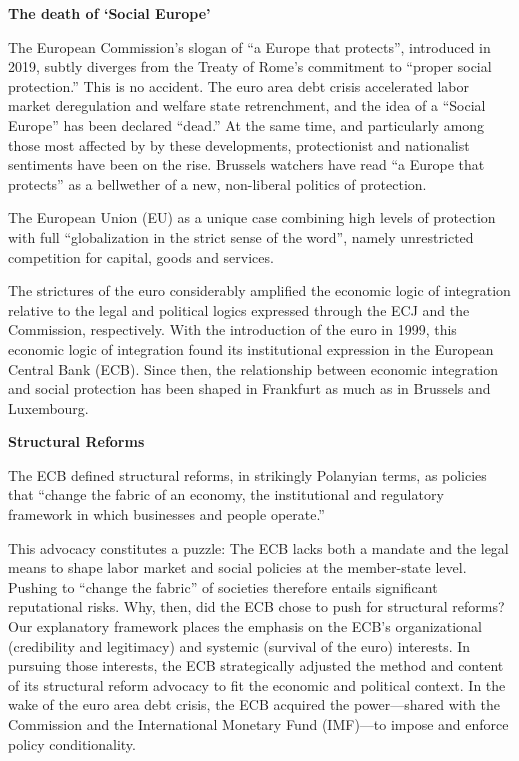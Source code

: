 \documentclass[
]{book}
\begin{document}
\textbf{The death of `Social Europe'}

The European Commission's slogan of ``a Europe that protects'', introduced in 2019,
subtly diverges from the Treaty of Rome's commitment to ``proper social protection.''
This is no accident.
The euro area debt crisis accelerated labor market deregulation and
welfare state retrenchment, and the idea of a ``Social Europe'' has been declared ``dead.''
At the same time, and particularly among those most affected by by these developments,
protectionist and nationalist sentiments have been on the rise.
Brussels watchers have read ``a Europe that protects'' as a bellwether
of a new, non-liberal politics of protection.

The European Union (EU) as a unique case combining
high levels of protection with full
``globalization in the strict sense of the word'',
namely unrestricted competition for capital, goods and services.

The strictures of the euro considerably amplified the economic
logic of integration relative to the legal and political logics
expressed through the ECJ and the Commission, respectively.
With the introduction of the euro in 1999, this economic
logic of integration found its institutional expression in
the European Central Bank (ECB).
Since then, the relationship between economic integration and
social protection has been shaped in Frankfurt as much as in Brussels and Luxembourg.

\textbf{Structural Reforms}

The ECB defined structural reforms, in strikingly Polanyian terms, as policies
that ``change the fabric of an economy, the institutional and regulatory framework in
which businesses and people operate.''

This advocacy constitutes a puzzle:
The ECB lacks both a mandate and the legal means to
shape labor market and social policies
at the member-state level.
Pushing to ``change the fabric'' of societies therefore entails significant
reputational risks.
Why, then, did the ECB chose to push for structural reforms?
Our explanatory framework places the emphasis on
the ECB's organizational (credibility and legitimacy) and
systemic (survival of the euro) interests.
In pursuing those interests, the ECB strategically adjusted the method and content of
its structural reform advocacy to fit the economic and political context.
In the wake of the euro area debt crisis, the
ECB acquired the power---shared with the Commission and the International Monetary
Fund (IMF)---to impose and enforce policy conditionality.
\end{document}

